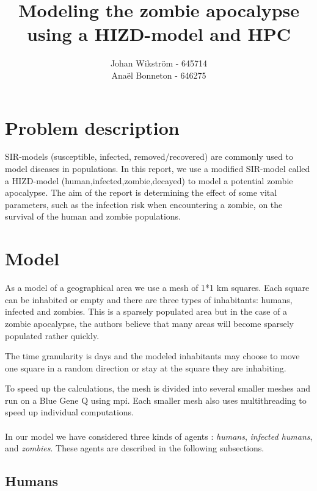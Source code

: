 \documentclass{report}
\begin{document}
\title{Modeling the zombie apocalypse using a HIZD-model and HPC}
\author{Johan Wikström - 645714 \\
        Anaël Bonneton - 646275}
\maketitle
\tableofcontents

\section{Problem description}	
SIR-models (susceptible, infected, removed/recovered) are commonly used to model diseases in populations. In this report, we use a modified SIR-model called a HIZD-model (human,infected,zombie,decayed) to model a potential zombie apocalypse. The aim of the report is determining the effect of some vital parameters, such as the infection risk when encountering a zombie, on the survival of the human and zombie populations.

\section{Model}
As a model of a geographical area we use a mesh of 1*1 km squares. Each square can be inhabited or empty and there are three types of inhabitants: humans, infected and zombies. This is a sparsely populated area but in the case of a zombie apocalypse, the authors believe that many areas will become sparsely populated rather quickly.

The time granularity is days and the modeled inhabitants may choose to move one square in a random direction or stay at the square they are inhabiting.

To speed up the calculations, the mesh is divided into several smaller meshes and run on a Blue Gene Q using mpi. Each smaller mesh also uses multithreading to speed up individual computations.


\paragraph{}
In our model we have considered three kinds of agents : \emph{humans}, \emph{infected humans}, and \emph{zombies}. These agents are described in the following subsections.

\subsection{Humans}
\end{document}
